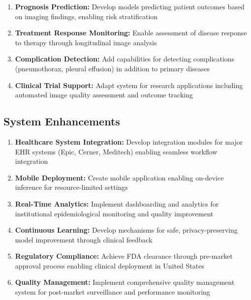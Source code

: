 {\begin{enumerate}
    \item \textbf{Prognosis Prediction:} Develop models predicting patient outcomes based on imaging findings, enabling risk stratification
    
    \item \textbf{Treatment Response Monitoring:} Enable assessment of disease response to therapy through longitudinal image analysis
    
    \item \textbf{Complication Detection:} Add capabilities for detecting complications (pneumothorax, pleural effusion) in addition to primary diseases
    
    \item \textbf{Clinical Trial Support:} Adapt system for research applications including automated image quality assessment and outcome tracking
\end{enumerate}

\subsection{System Enhancements}

\begin{enumerate}
    \item \textbf{Healthcare System Integration:} Develop integration modules for major EHR systems (Epic, Cerner, Meditech) enabling seamless workflow integration
    
    \item \textbf{Mobile Deployment:} Create mobile application enabling on-device inference for resource-limited settings
    
    \item \textbf{Real-Time Analytics:} Implement dashboarding and analytics for institutional epidemiological monitoring and quality improvement
    
    \item \textbf{Continuous Learning:} Develop mechanisms for safe, privacy-preserving model improvement through clinical feedback
    
    \item \textbf{Regulatory Compliance:} Achieve FDA clearance through pre-market approval process enabling clinical deployment in United States
    
    \item \textbf{Quality Management:} Implement comprehensive quality management system for post-market surveillance and performance monitoring
\end{enumerate}

}
